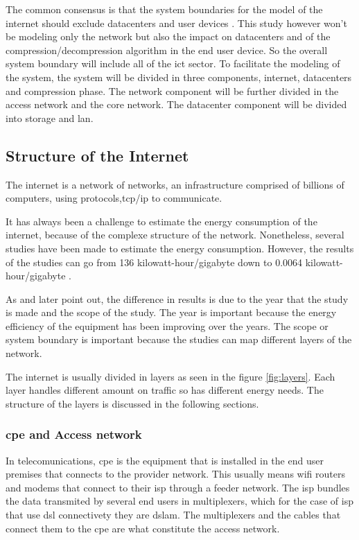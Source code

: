 The common consensus is that the system boundaries for the model of the internet should exclude datacenters and user devices \citet{Coroama2014}. This study however won't be modeling only the network but also the impact on datacenters and of the compression/decompression algorithm in the end user device. So the overall system boundary will include all of the \ac{ict} sector. To facilitate the modeling of the system, the system will be divided in three components, internet,  datacenters and compression phase. The network component will be further divided in the access network and the core network. The datacenter component will be divided into storage and \ac{lan}.



\subsection{Structure of the Internet}

The internet is a network of networks, an infrastructure comprised of billions of computers, 
using protocols,\ac{tcp}/\ac{ip} to communicate.

It has always been a challenge to estimate the energy consumption of the internet, because of the complexe structure of the network. Nonetheless, several studies have been made to estimate the energy consumption. However, the results of the studies can go from 136 \ac{kilowatt-hour}/\ac{gigabyte}
\citet{Koomey2003} down to 0.0064 \ac{kilowatt-hour}/\ac{gigabyte} \citet{Baliga2011}.

As \citet{Coroama2015} and later \citet{Aslan2018} point out, the difference in results is due to the year that the study is made and the scope of the study. 
The year is important because the energy efficiency of the equipment has been improving over the years. 
The scope or system boundary is important because the studies can map different layers of the network.

The internet is usually divided in layers as seen in the figure \ref{fig:layers}. 
Each layer handles different amount on traffic so has different energy needs.
The structure of the layers is discussed in the following sections.  

\subsubsection{\acl{cpe} and Access network}

In telecomunications, \ac{cpe} is the equipment that is installed in the end user premises that connects to the provider network. This usually means wifi routers and modems that connect to their \ac{isp} through a feeder network. The \ac{isp} bundles the data transmited by several end users in multiplexers, which for the case of \ac{isp} that use \ac{dsl} connectivety they are \ac{dslam}. The multiplexers and the cables that connect them to the \ac{cpe} are what constitute the access network.

